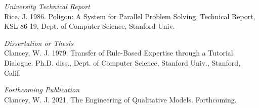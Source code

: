 \documentclass[letterpaper]{article} %
\begin{document}
\smallskip \noindent \textit{University Technical Report}\\
Rice, J. 1986. Poligon: A System for Parallel Problem Solving, Technical Report, KSL-86-19, Dept. of Computer Science, Stanford Univ.

\smallskip \noindent \textit{Dissertation or Thesis}\\
Clancey, W. J. 1979. Transfer of Rule-Based Expertise through a Tutorial Dialogue. Ph.D. diss., Dept. of Computer Science, Stanford Univ., Stanford, Calif.

\smallskip \noindent \textit{Forthcoming Publication}\\
Clancey, W. J. 2021. The Engineering of Qualitative Models. Forthcoming.


\citeyear{texbook,knuth:1984, latex2e}
\end{document}
